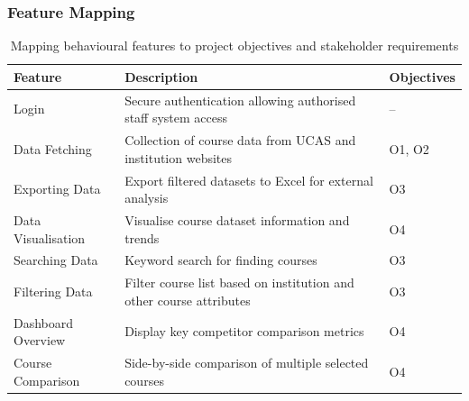 \subsubsection{Feature Mapping}
\vspace{-20pt}
\begin{table}[h]
\centering
\begin{xltabular}{\textwidth}{@{} l X l} 
\caption{Mapping behavioural features to project objectives and stakeholder requirements} \\
\toprule
\textbf{Feature} & \textbf{Description} & \textbf{Objectives} \\
\midrule
Login & Secure authentication allowing authorised staff system access & -- \\
Data Fetching & Collection of course data from UCAS and institution websites & O1, O2 \\
Exporting Data & Export filtered datasets to Excel for external analysis & O3 \\
Data Visualisation & Visualise course dataset information and trends & O4 \\
Searching Data & Keyword search for finding courses & O3 \\
Filtering Data & Filter course list based on institution and other course attributes & O3 \\
Dashboard Overview & Display key competitor comparison metrics & O4 \\
Course Comparison & Side-by-side comparison of multiple selected courses & O4 \\
\bottomrule
\end{xltabular}
\end{table}
\vspace{-16pt}